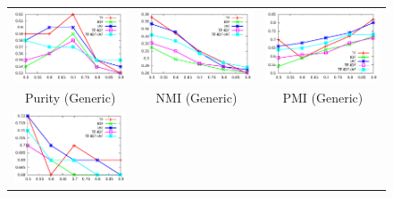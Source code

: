 \documentclass[10pt,a5paper,twoside]{article}
\begin{document}
\begin{figure}[t!]
\begin{center}
\resizebox{14cm}{!} 
{
	\begin{tabular}{ccc}
		\includegraphics[width=200pt]{Figs/1-1.pdf} & 
		\includegraphics[width=200pt]{Figs/1-2.pdf} & 
		\includegraphics[width=200pt]{Figs/1-3.pdf} \\  
	\vspace{-1mm}
		{ Purity (Generic)} & { NMI (Generic)} & 
		{ PMI (Generic)}\\
	\vspace{-1mm}	
		\includegraphics[width=200pt]{Figs/2-1.pdf} & 

\end{tabular}}
\end{center}
\end{figure}
\end{document}
